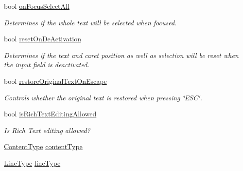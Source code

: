 \begin{DoxyCompactItemize}
bool \mbox{\hyperlink{class_t_m_pro_1_1_t_m_p___input_field_abf3bccd8c0c63eff2f8de40194d6aeb7}{on\+Focus\+Select\+All}}
\begin{DoxyCompactList}\small\item\em Determines if the whole text will be selected when focused. \end{DoxyCompactList}\item 
bool \mbox{\hyperlink{class_t_m_pro_1_1_t_m_p___input_field_a614c7ba0b401a31c87380e49fee3d443}{reset\+On\+De\+Activation}}
\begin{DoxyCompactList}\small\item\em Determines if the text and caret position as well as selection will be reset when the input field is deactivated. \end{DoxyCompactList}\item 
bool \mbox{\hyperlink{class_t_m_pro_1_1_t_m_p___input_field_a9a402064db2a20ffce7abb59d2619688}{restore\+Original\+Text\+On\+Escape}}
\begin{DoxyCompactList}\small\item\em Controls whether the original text is restored when pressing \char`\"{}\+E\+S\+C\char`\"{}. \end{DoxyCompactList}\item 
bool \mbox{\hyperlink{class_t_m_pro_1_1_t_m_p___input_field_ab710f2c64b44e6c2c4fe4a10542e67fc}{is\+Rich\+Text\+Editing\+Allowed}}
\begin{DoxyCompactList}\small\item\em Is Rich Text editing allowed? \end{DoxyCompactList}\item 
\mbox{\hyperlink{class_t_m_pro_1_1_t_m_p___input_field_a30e2af425a58881d8b71361e70ddbe27}{Content\+Type}} \mbox{\hyperlink{class_t_m_pro_1_1_t_m_p___input_field_af72fd8ccfa126c4a684801ea3de9b93c}{content\+Type}}
\item 
\mbox{\hyperlink{class_t_m_pro_1_1_t_m_p___input_field_a0da8af0aef5faef7c405ac72d28bd214}{Line\+Type}} \mbox{\hyperlink{class_t_m_pro_1_1_t_m_p___input_field_aca5c1fb3adf7c83602b96eaf7aa77405}{line\+Type}}

\end{DoxyCompactItemize}
